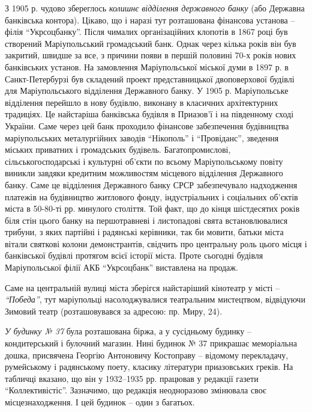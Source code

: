 
З 1905 р. чудово збереглось \emph{колишнє відділення державного банку} (або Державна
банківська контора). Цікаво, що і наразі тут розташована фінансова установа –
філія \enquote{Укрсоцбанку}. Після чималих організаційних клопотів в 1867 році був
створений Маріупольський громадський банк. Однак через кілька років він був
закритий, швидше за все, з причини появи в першій половині 70-х років нових
банківських установ. На замовлення Маріупольської міської думи в 1897 р. в
Санкт-Петербурзі був складений проект представницької двоповерхової будівлі для
Маріупольського відділення Державного банку. У 1905 р. Маріупольське відділення
перейшло в нову будівлю, виконану в класичних архітектурних традиціях. Це
найстаріша банківська будівля в Приазов'ї і на південному сході України. Саме
через цей банк проходило фінансове забезпечення будівництва маріупольських
металургійних заводів \enquote{Нікополь} і \enquote{Провіданс}, зведення міських приватних і
громадських будівель. Багатопромислові, сільськогосподарські і культурні
об'єкти по всьому Маріупольському повіту виникли завдяки кредитним можливостям
місцевого відділення Державного банку. Саме це відділення Державного банку СРСР
забезпечувало надходження платежів на будівництво житлового фонду,
індустріальних і соціальних об'єктів міста в 50-80-ті рр. минулого століття.
Той факт, що до кінця шістдесятих років біля стін цього банку на першотравневі
і листопадові свята встановлювалися трибуни, з яких партійні і радянські
керівники, так би мовити, батьки міста вітали святкові колони демонстрантів,
свідчить про центральну роль цього місця і банківської будівлі протягом всієї
історії міста. Проте сьогодні будівля Маріупольської філії АКБ \enquote{Укрсоцбанк}
виставлена на продаж.

Саме на центральній вулиці міста зберігся найстаріший кінотеатр у місті –
\emph{\enquote{Победа}}, тут маріупольці насолоджувалися театральним мистецтвом, відвідуючи
Зимовий театр (розташовувався за адресою: пр. Миру, 24).


\emph{У будинку № 37} була розташована біржа, а у сусідньому будинку – кондитерський і
булочний магазин. Нині будинок № 37 прикрашає меморіальна дошка, присвячена
Георгію Антоновичу Костоправу – відомому перекладачу, румейському і радянському
поету, класику літератури приазовських греків. На табличці вказано, що він у
1932–1935 рр. працював у редакції газети \enquote{Коллективістіс}. Зазначимо, що
редакція неодноразово змінювала своє місцезнаходження. І цей будинок – один з
багатьох.


